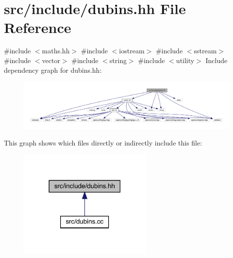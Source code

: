 \hypertarget{dubins_8hh}{}\section{src/include/dubins.hh File Reference}
\label{dubins_8hh}
{\ttfamily \#include $<$maths.\+hh$>$}\newline
{\ttfamily \#include $<$iostream$>$}\newline
{\ttfamily \#include $<$sstream$>$}\newline
{\ttfamily \#include $<$vector$>$}\newline
{\ttfamily \#include $<$string$>$}\newline
{\ttfamily \#include $<$utility$>$}\newline
Include dependency graph for dubins.\+hh\+:
\nopagebreak
\begin{figure}[H]
\begin{center}
\leavevmode
\includegraphics[width=350pt]{dubins_8hh__incl}
\end{center}
\end{figure}
This graph shows which files directly or indirectly include this file\+:
\nopagebreak
\begin{figure}[H]
\begin{center}
\leavevmode
\includegraphics[width=190pt]{dubins_8hh__dep__incl}
\end{center}
\end{figure}
